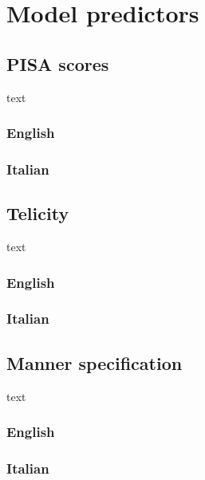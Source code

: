 \setchapterpreamble[u]{\margintoc}
\chapter{Model predictors}


\section{PISA scores} 

text 

\subsection{English}

\subsection{Italian}



\section{Telicity} 

text 

\subsection{English}

\subsection{Italian}



\section{Manner specification} 

text 

\subsection{English}

\subsection{Italian}
